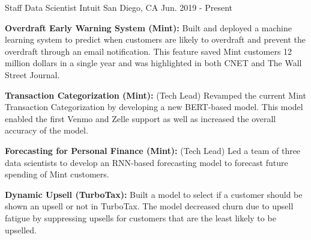 


\begin{cventries}




\cventry
    {Staff Data Scientist} %
    {Intuit} %
    {San Diego, CA} %
    {Jun. 2019 - Present} %
    {\begin{cvitems}
        \setlength\itemsep{.15em}
        \item { \textbf{Overdraft Early Warning System (Mint): }Built and deployed a machine learning system to predict when customers are likely to overdraft and prevent the overdraft through an email notification. This feature saved Mint customers 12 million dollars in a single year and was highlighted in both CNET and The Wall Street Journal. }
        \item { \textbf{Transaction Categorization (Mint): } (Tech Lead) Revamped the current Mint Transaction Categorization by developing a new BERT-based model. This model enabled the first Venmo and Zelle support as well as increased the overall accuracy of the model. }
         \item { \textbf{Forecasting for Personal Finance (Mint): } (Tech Lead) Led a team of three data scientists to develop an RNN-based forecasting model to forecast future spending of Mint customers.}
         \item { \textbf{Dynamic Upsell (TurboTax):} Built a model to select if a customer should be shown an upsell or not in TurboTax. The model decreased churn due to upsell fatigue by suppressing upsells for customers that are the least likely to be upselled. }
     \end{cvitems}}



\end{cventries}
